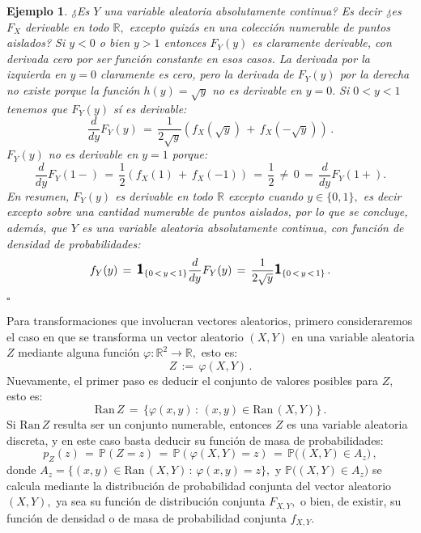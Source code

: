 \documentclass[spanish,10pt,letterpaper]{article}
\newtheorem{ejem}{Ejemplo}
\newcommand{\prob}{\mathbb{P}}
\newcommand{\Runo}{\mathbb{R}}
\newcommand{\indic}{\textbf{\textsf{\large{1}}}}
\newcommand{\qed}{\begin{flushright}$\square$\end{flushright}}
\begin{document}
\begin{ejem}
    ¿Es $Y$ una variable aleatoria absolutamente continua? Es decir ¿es $F_X$ derivable en todo $\Runo,$ excepto quizás en una colección numerable de puntos aislados? Si $y<0$ o bien $y>1$ entonces $F_Y(y)$ es claramente derivable, con derivada cero por ser función constante en esos casos. La derivada por la izquierda en $y=0$ claramente es cero, pero la derivada de $F_Y(y)$ por la derecha no existe porque la función $h(y)=\sqrt{y}$ no es derivable en $y=0.$ Si $0<y<1$ tenemos que $F_Y(y)$ sí es derivable:
    $$\frac{d}{dy}F_Y(y) \,=\, \frac{1}{2\sqrt{y}}\left(f_X(\sqrt{y}) \,+\, f_X(-\sqrt{y})\right)\,.$$
    $F_Y(y)$ no es derivable en $y=1$ porque:
    $$\frac{d}{dy}F_Y(1-) \,=\, \frac{1}{2}\left(f_X(1) \,+\, f_X(-1)\right) \,=\, \frac{1}{2} \,\neq\, 0 \,=\, \frac{d}{dy}F_Y(1+).$$
    En resumen, $F_Y(y)$ es derivable en todo $\Runo$ excepto cuando $y\in\{0,1\},$ es decir excepto sobre una cantidad numerable de puntos aislados, por lo que se concluye, además, que $Y$ es una variable aleatoria absolutamente continua, con función de densidad de probabilidades:
    $$f_Y(y) \,=\, \indic_{\{0\,<\,y\,<\,1\}}\frac{d}{dy}F_Y(y) \,=\, \frac{1}{2\sqrt{y}}\indic_{\{0\,<\,y\,<\,1\}}\,.$$ \qed 
\end{ejem}


\bigskip

Para transformaciones que involucran vectores aleatorios, primero consideraremos el caso en que se transforma un vector aleatorio $(X,Y)$ en una variable aleatoria $Z$ mediante alguna función $\varphi:\Runo^2\rightarrow\Runo,$ esto es:
\begin{equation}\label{eq:transfvecvar}
    Z \,:=\, \varphi(X,Y)\,.
\end{equation}
Nuevamente, el primer paso es deducir el conjunto de valores posibles para $Z,$ esto es:
\begin{equation}\label{eq:RanZvXY}
    \text{Ran}\,Z \,=\, \{\varphi(x,y)\,:\,(x,y)\in\text{Ran}\,(X,Y)\}\,.
\end{equation}
Si $\text{Ran}\,Z$ resulta ser un conjunto numerable, entonces $Z$ es una variable aleatoria discreta, y en este caso basta deducir su función de masa de probabilidades:
\begin{equation}\label{eq:fmpZvXY}
    p_Z(z) \,=\, \prob(Z=z) \,=\, \prob(\varphi(X,Y)=z) \,=\, \prob\big((X,Y)\in A_z\big)\,,
\end{equation}
donde $A_z=\{(x,y)\in\text{Ran}\,(X,Y)\,:\,\varphi(x,y)=z\},$ y $\prob\big((X,Y)\in A_z\big)$ se calcula mediante la distribución de probabilidad conjunta del vector aleatorio $(X,Y),$ ya sea su función de distribución conjunta $F_{X,Y},$ o bien, de existir, su función de densidad o de masa de probabilidad conjunta $f_{X,Y}.$
\end{document}

